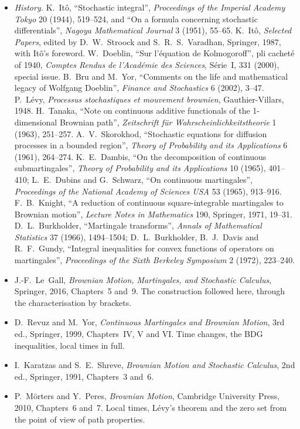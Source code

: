 \begin{itemize}
\item \emph{History.} K.~It\^o, ``Stochastic integral'', \emph{Proceedings of the Imperial Academy Tokyo} 20 (1944), 519--524, and ``On a formula concerning stochastic differentials'', \emph{Nagoya Mathematical Journal} 3
(1951), 55--65. K.~It\^o, \emph{Selected Papers}, edited by D.~W.~Stroock and S.~R.~S.~Varadhan, Springer, 1987, with It\^o's foreword. W.~Doeblin, ``Sur l'\'equation de Kolmogoroff'', pli cachet\'e of 1940,
\emph{Comptes Rendus de l'Acad\'emie des Sciences}, S\'erie~I, 331 (2000), special issue. B.~Bru and M.~Yor, ``Comments on the life and mathematical legacy of Wolfgang Doeblin'', \emph{Finance and Stochastics} 6
(2002), 3--47. P.~L\'evy, \emph{Processus stochastiques et mouvement brownien}, Gauthier-Villars, 1948. H.~Tanaka, ``Note on continuous additive functionals of the 1-dimensional Brownian path'',
\emph{Zeitschrift f\"ur Wahrscheinlichkeitstheorie} 1 (1963), 251--257. A.~V.~Skorokhod, ``Stochastic equations for diffusion processes in a bounded region'', \emph{Theory of Probability and its Applications} 6 (1961),
264--274. K.~E.~Dambis, ``On the decomposition of continuous submartingales'', \emph{Theory of Probability and its Applications} 10 (1965), 401--410; L.~E.~Dubins and G.~Schwarz, ``On continuous martingales'',
\emph{Proceedings of the National Academy of Sciences USA} 53 (1965), 913--916. F.~B.~Knight, ``A reduction of continuous square-integrable martingales to Brownian motion'',
\emph{Lecture Notes in Mathematics} 190, Springer, 1971, 19--31. D.~L.~Burkholder, ``Martingale transforms'', \emph{Annals of Mathematical Statistics} 37 (1966), 1494--1504;
D.~L.~Burkholder, B.~J.~Davis and R.~F.~Gundy, ``Integral inequalities for convex functions of operators on martingales'', \emph{Proceedings of the Sixth Berkeley Symposium} 2 (1972), 223--240.
\item J.-F.~Le~Gall, \emph{Brownian Motion, Martingales, and Stochastic Calculus}, Springer, 2016, Chapters~5 and~9. The construction followed here, through the characterisation by brackets.
\item D.~Revuz and M.~Yor, \emph{Continuous Martingales and Brownian Motion}, 3rd ed., Springer, 1999, Chapters~IV, V and VI. Time changes, the BDG inequalities, local times in full.
\item I.~Karatzas and S.~E.~Shreve, \emph{Brownian Motion and Stochastic Calculus}, 2nd ed., Springer, 1991, Chapters~3 and~6.
\item P.~M\"orters and Y.~Peres, \emph{Brownian Motion}, Cambridge University Press, 2010, Chapters~6 and~7. Local times, L\'evy's theorem and the zero set from the point of view of path properties.
\end{itemize}
